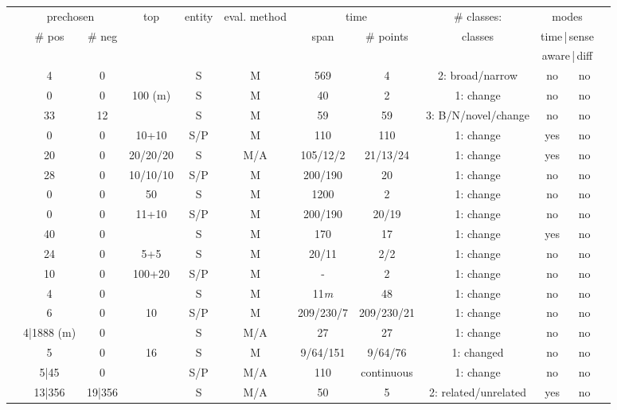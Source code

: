 \documentclass[output=paper]{langsci/langscibook}
\begin{document}
\begin{table}
\footnotesize
\begin{tabular}{@{}l@{}c@{}cc@{}cc@{}cc@{}cccc@{}}
\lsptoprule
&\multicolumn{2}{c}{prechosen} & top & entity &eval. method & \multicolumn{2}{c}{time} & \# classes: & 
\multicolumn{2}{c}{modes}\\
& \# pos & \# neg & &   &  & span & \# points & classes & \multicolumn{2}{c}{{time\,|\,sense}}\\
&  &  & &   &  &  &  & & \multicolumn{2}{c}{{aware\,|\,diff}}\\
\midrule
{\citet{sagi-etal-2009-semantic}} & 4 & 0 & &S& M&  569 & 4 & 
2: broad/narrow& no&no  \\
%
{\citet{gulordava-baroni-2011-distributional}} & 0&0 & 100 (m) & S & M & 40 & 2 & 
1: change & no &no\\
%
{\citet{tang2013}}& 33 & 12& & S & M & 59 & 59 & 
3: B/N/novel/change & no & no\\
%
{\citet{kim-etal-2014-temporal}} & 0 & 0& 10+10 & S/P & M & 110 & 110 &  
1: change & yes & no\\
%
{\citet{kulkarni2015statistically}}& 20 & 0 &20/20/20 & S & M/A & 105/12/2 & 21/13/24 & 
1: change & yes&no\\
%
{\citet{hamilton-etal-2016-diachronic}} & 28 & 0 & 10/10/10 & S/P & M  & 200/190 & 20& 
1: change & no&no\\ 
%
{\citet{rodda2016panta-journal}} & 0 & 0 & 50  & S & M & 1200 & 2 & %
1: change& no & no\\
%
{\citet{eger-mehler-2016-linearity}} & 0 & 0 & 11+10 & S/P & M & 200/190 & 20/19 & 
1: change & no & no\\
{\citet{basilediachronic}} & 40 & 0 & & S & M & 170& 17 & 
1: change & yes & no\\
%
{\citet{wordsaremalleable}} & 24 & 0& 5+5 &S & M & 20/11& 2/2&  
1: change & no & no\\
{\citet{japnloanwords} }& 10 & 0 & 100+20 & S/P & M & - & 2 &  
1: change & no & no\\
%
{\citet{kahmannnh17}} & 4 & 0 & & S & M & 11\textit{m} & 48 &  
1: change& no & no\\
%
{\citet{bamler17}} & 6 & 0 & 10 & S/P& M & 209/230/7 & 209/230/21 &  
1: change & no & no\\
%
{\citet{yao2018dynamic}} & 4|1888 (m) & 0 & & S & M/A & 27 & 27 &  
1: change & no & no\\
\citet{rudolphb18-dynamicembforlangevo} &5 & 0& 16 & S & M & 9/64/151 & 9/64/76&  
1: changed & no & no\\
{\citet{rosenfeld-erk-2018-deep}} & 5|45 & 0 & & S/P & M/A & 110 & continuous &  
1: change & no & no\\
\citet{dubossarsky-etal-2019-time} & 13|356  & 19|356 & & S & M/A & 50 & 5 & 
2: related/unrelated & yes & no\\
\midrule
\end{tabular}
\end{table}
\end{document}
